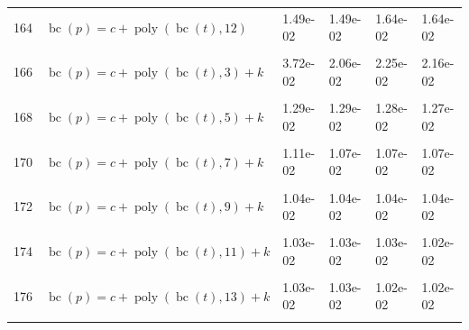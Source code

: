 \documentclass[12pt,a4paper]{article}
\DeclareMathOperator{\bc}{bc}
\DeclareMathOperator{\poly}{poly}
\begin{document}
\begin{longtable}[t]{ll>{\raggedleft\arraybackslash}p{2cm}>{\raggedleft\arraybackslash}p{2cm}>{\raggedleft\arraybackslash}p{2cm}>{\raggedleft\arraybackslash}p{2cm}}
164 & $\bc(p) = c + \poly\left( \bc(t), 12 \right)$ & 1.49e-02 & 1.49e-02 & 1.64e-02 & 1.64e-02\\
\cellcolor{gray!6}{165} & \cellcolor{gray!6}{$\bc(p) = c + \poly\left( \bc(t), 13 \right)$} & \cellcolor{gray!6}{1.49e-02} & \cellcolor{gray!6}{1.49e-02} & \cellcolor{gray!6}{1.64e-02} & \cellcolor{gray!6}{1.64e-02}\\
166 & $\bc(p) = c + \poly\left( \bc(t), 3 \right) + k$ & 3.72e-02 & 2.06e-02 & 2.25e-02 & 2.16e-02\\
\cellcolor{gray!6}{167} & \cellcolor{gray!6}{$\bc(p) = c + \poly\left( \bc(t), 4 \right) + k$} & \cellcolor{gray!6}{2.66e-02} & \cellcolor{gray!6}{2.32e-02} & \cellcolor{gray!6}{2.57e-02} & \cellcolor{gray!6}{2.47e-02}\\
168 & $\bc(p) = c + \poly\left( \bc(t), 5 \right) + k$ & 1.29e-02 & 1.29e-02 & 1.28e-02 & 1.27e-02\\
\cellcolor{gray!6}{169} & \cellcolor{gray!6}{$\bc(p) = c + \poly\left( \bc(t), 6 \right) + k$} & \cellcolor{gray!6}{1.26e-02} & \cellcolor{gray!6}{1.18e-02} & \cellcolor{gray!6}{1.29e-02} & \cellcolor{gray!6}{1.20e-02}\\
170 & $\bc(p) = c + \poly\left( \bc(t), 7 \right) + k$ & 1.11e-02 & 1.07e-02 & 1.07e-02 & 1.07e-02\\
\cellcolor{gray!6}{171} & \cellcolor{gray!6}{$\bc(p) = c + \poly\left( \bc(t), 8 \right) + k$} & \cellcolor{gray!6}{1.05e-02} & \cellcolor{gray!6}{1.04e-02} & \cellcolor{gray!6}{1.04e-02} & \cellcolor{gray!6}{1.04e-02}\\
172 & $\bc(p) = c + \poly\left( \bc(t), 9 \right) + k$ & 1.04e-02 & 1.04e-02 & 1.04e-02 & 1.04e-02\\
\cellcolor{gray!6}{173} & \cellcolor{gray!6}{$\bc(p) = c + \poly\left( \bc(t), 10 \right) + k$} & \cellcolor{gray!6}{1.03e-02} & \cellcolor{gray!6}{1.03e-02} & \cellcolor{gray!6}{1.03e-02} & \cellcolor{gray!6}{1.02e-02}\\
174 & $\bc(p) = c + \poly\left( \bc(t), 11 \right) + k$ & 1.03e-02 & 1.03e-02 & 1.03e-02 & 1.02e-02\\
\cellcolor{gray!6}{175} & \cellcolor{gray!6}{$\bc(p) = c + \poly\left( \bc(t), 12 \right) + k$} & \cellcolor{gray!6}{1.03e-02} & \cellcolor{gray!6}{1.03e-02} & \cellcolor{gray!6}{1.02e-02} & \cellcolor{gray!6}{1.02e-02}\\
176 & $\bc(p) = c + \poly\left( \bc(t), 13 \right) + k$ & 1.03e-02 & 1.03e-02 & 1.02e-02 & 1.02e-02\\
\cellcolor{gray!6}{177} & \cellcolor{gray!6}{$\bc(p) = c + \poly\left( \bc(t), 3 \right) * k$} & \cellcolor{gray!6}{3.55e-02} & \cellcolor{gray!6}{1.77e-02} & \cellcolor{gray!6}{1.99e-02} & \cellcolor{gray!6}{1.90e-02}\\

\end{longtable}
\end{document}
